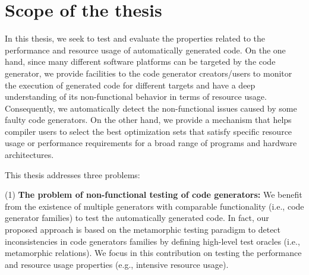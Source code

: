 



\section{Scope of the thesis}

In this thesis, we seek to test and evaluate the properties related to the performance and resource usage of automatically generated code. 
On the one hand, since many different software platforms can be targeted by the code generator, we provide facilities to the code generator creators/users to monitor the execution of generated code for different targets and have a deep understanding of its non-functional behavior in terms of resource usage. Consequently, we automatically detect the non-functional issues caused by some faulty code generators. 
On the other hand, we provide a mechanism that helps compiler users to select the best optimization sets that satisfy specific resource usage or performance requirements for a broad range of programs and hardware architectures.

This thesis addresses three problems: 
	
	(1) \textbf{The problem of non-functional testing of code generators:} We benefit from the existence of multiple generators with comparable functionality (i.e., code generator families) to test the automatically generated code. In fact, our proposed approach is based on the metamorphic testing paradigm to detect inconsistencies in code generators families by defining high-level test oracles (i.e., metamorphic relations). We focus in this contribution on testing the performance and resource usage properties (e.g., intensive resource usage).
	
